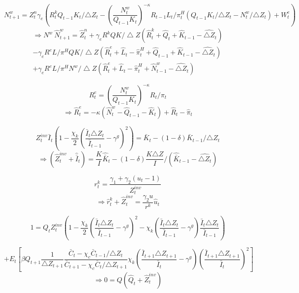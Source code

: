 \documentclass[11pt, a4paper]{article}
\begin{document}
\begin{itemize}
    \[ N^w_{t+1} = Z_t^n \gamma_e\left(R_t^k Q_{t-1} K_t/ {\bigtriangleup Z_t}   - \left(\frac{N^w_t}{Q_{t-1} K_t} \right)^{-\kappa} R_{t-1} L_t /\pi_t^H (Q_{t-1}K_{t}/{\bigtriangleup Z_t} - N^w_{t}/{\bigtriangleup Z_t})+ W_t^e \right)  \]  \begin{eqnarray*}
\Rightarrow   N^w~ \widehat{N}^w_{t+1} = \widehat{Z}_t^n +  \gamma_eR^k Q K/\bigtriangleup Z(\widehat{R}_t^k + \widehat{Q}_t + \widehat{K}_{t-1} - \widehat{\bigtriangleup Z}_{t})\\
 - \gamma_eR^e L/\pi^HQK/\bigtriangleup Z (\widehat{R}_t^e + \widehat{L}_t - \widehat{\pi}_t^H + \widehat{Q}_{t-1} + \widehat{K}_{t-1} - \widehat{\bigtriangleup Z}_t) \\
   + \gamma_eR^e L/\pi^HN^w/\bigtriangleup Z (\widehat{R}_t^e + \widehat{L}_t - \widehat{\pi}_t^H + \widehat{N}^w_{t-1}  - \widehat{\bigtriangleup Z}_t)
    \end{eqnarray*}
    
    \[R_t^e =\left(\frac{N^w_t}{Q_{t-1} K_t} \right)^{-\kappa} R_t/\pi_{t} \]
    \begin{equation}\Rightarrow\widehat{R}_t^e = -\kappa \left( \widehat{N}_t^w - \widehat{Q}_{t-1} -\widehat{K}_t  \right) + \widehat{R}_t - \widehat{\pi}_{t}\end{equation}
    
    \[Z_t^{inv} \bar{I}_t \left(1-\frac{\chi_k}{2} \left(\frac{\bar{I}_t {\bigtriangleup Z_t}}{\bar{I}_{t-1}} -\gamma^g \right)^2  \right )= \bar{K}_t -(1-\delta) \bar{K}_{t-1}/{\bigtriangleup Z_t} \]
    \begin{equation}
    \Rightarrow ( \widehat{Z}_t^{inv} + \widehat{\bar{I}}_t) = \frac{K}{I} \widehat{\bar{K}}_t - (1-\delta) \frac{K{\bigtriangleup Z}}{I}/(\widehat{\bar{K}}_{t-1} - \widehat{\bigtriangleup Z_t})
    \end{equation}
    
    \[r_t^k = \frac{\gamma_1 + \gamma_2(u_t -1)}{Z_t^{inv}}\]
    \begin{equation} 
      \Rightarrow  \widehat{r}_t^k + \widehat{Z}_t^{inv}= \frac{\gamma_2u}{r^k} \widehat{u}_t     
    \end{equation} 
    
    \[1 = Q_t Z_t^{inv}\left(1-\frac{\chi_k}{2} \left(\frac{\bar{I}_t {\bigtriangleup Z_t}}{\bar{I}_{t-1}} -\gamma^g\right)^2 -\chi_k\left(\frac{\bar{I}_t {\bigtriangleup Z_t}}{\bar{I}_{t-1} } - \gamma^g  \right)\frac{\bar{I}_t {\bigtriangleup Z_t}}{\bar{I}_{t-1} }  \right)\]
    
    \[  + E_t\left[ \beta Q_{t+1}\frac{1}{\bigtriangleup Z_{t+1}}\frac{\bar{C}_{t}-\chi_c \bar{C}_{t-1}/{\bigtriangleup Z_t}}{\bar{C}_{t+1}-\chi_c \bar{C}_{t}/{\bigtriangleup Z_{t+1}}}\chi_k \left(\frac{\bar{I}_{t+1} {\bigtriangleup Z_{t+1}}}{\bar{I}_{t} } - \gamma^g  \right) \left(\frac{\bar{I}_{t+1} {\bigtriangleup Z_{t+1}}}{\bar{I}_{t} } \right)^2 \right]\]
    \begin{equation} \Rightarrow 0= Q(\widehat{Q}_t + \widehat{Z}_t^{inv}) \end{equation}


\end{itemize}
\end{document}
